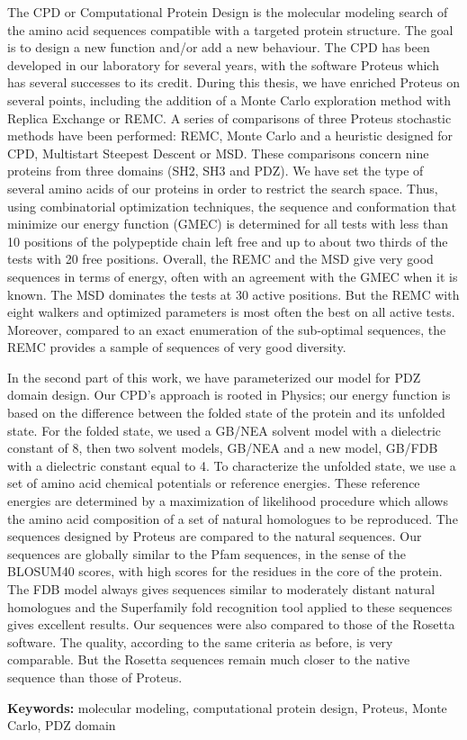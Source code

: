 The CPD or Computational Protein Design  is the molecular modeling search of the amino acid sequences compatible with a targeted protein structure.
The goal is to design a new function and/or add a new behaviour.
The CPD has been developed in our laboratory for several years, with the software Proteus which has several successes to its credit.
During this thesis, we have enriched Proteus on several points, including the addition of a Monte Carlo exploration method with Replica Exchange or REMC. A series of comparisons of three Proteus stochastic methods have been performed: REMC, Monte Carlo and a heuristic designed for CPD, Multistart Steepest Descent or MSD. These comparisons concern nine proteins from three domains (SH2, SH3 and PDZ). We have set the type of several amino acids of our proteins in order to restrict the search space. Thus, using combinatorial optimization techniques, the sequence and conformation that minimize our energy function (GMEC) is determined for all tests with less than 10 positions of the polypeptide chain left free and up to about two thirds of the tests with 20 free positions. Overall, the REMC and the MSD give very good sequences in terms of energy, often with an agreement with the GMEC when it is known. The MSD dominates the tests at 30 active positions. But the REMC with eight walkers and optimized parameters is most often the best on all active tests. Moreover, compared to an exact enumeration of the sub-optimal sequences, the REMC provides a sample of sequences of very good diversity.

In the second part of this work, we have parameterized our model for PDZ domain design. Our CPD's approach is rooted in Physics; our energy function is based on the difference between the folded state of the protein and its unfolded state. For the folded state, we used a GB/NEA solvent model with a dielectric constant of 8, then two solvent models, GB/NEA and a new model, GB/FDB with a dielectric constant equal to 4. To characterize the unfolded state, we use a set of amino acid chemical potentials or reference energies. These reference energies are determined by a maximization of likelihood procedure which allows the amino acid composition of a set of natural homologues to be reproduced. The sequences designed by Proteus are compared to the natural sequences. Our sequences are globally similar to the Pfam sequences, in the sense of the BLOSUM40 scores, with high scores for the residues in the core of the protein. The FDB model always gives sequences similar to moderately distant natural homologues and the Superfamily fold recognition tool applied to these sequences gives excellent results. Our sequences were also compared to those of the Rosetta software. The quality, according to the same criteria as before, is very comparable. But the Rosetta sequences remain much closer to the native sequence than those of Proteus.

\bigskip

\textbf{Keywords:} molecular modeling, computational protein design, Proteus, Monte Carlo, PDZ domain


